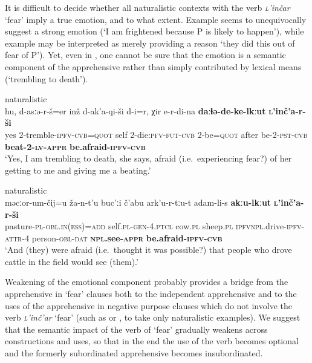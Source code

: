 \documentclass[output=paper,colorlinks,citecolor=brown]{langscibook}
\begin{document}
 It is difficult to decide whether all naturalistic contexts with the verb \textit{\textsc{l}'inčar} `fear' imply a true emotion, and to what extent. Example  seems to unequivocally suggest a strong emotion (`I am frightened because P is likely to happen'), while example  may be interpreted as merely providing a reason `they did this out of fear of P'). Yet, even in , one cannot be sure that the emotion is a semantic component of the apprehensive rather than simply contributed by lexical means (`trembling to death').


\ea \label{ex:DD25} \textnormal{naturalistic} \\
\gll hu, d-asːə-r-š=er inž d-ak'a-qi-ši d-i=r, χir e-r-di-na \textbf{daːɬə-de-ke-lkːut} \textbf{\textsc{l}'inč'a-r-ši} \\
yes 2-tremble-\textsc{ipfv-cvb=quot} self 2-die:\textsc{pfv-fut-cvb} 2-be=\textsc{quot} after be-2-\textsc{pst-cvb} \textbf{beat-2-\textsc{lv-appr}} \textbf{be.afraid-\textsc{ipfv-cvb}} \\
\glt `Yes, I am trembling to death, she says, afraid (i.e.\   experiencing fear?) of her getting to me and giving me a beating.'
\z

\newpage
\ea \label{ex:DD26} \textnormal{naturalistic} \\
\gll məcːor-um-čij=u ža-n-t'u buc'ːi č'abu a{\textlangle}r{\textrangle}k'u-r-tːu-t adam-li-s \textbf{akːu-lkːut} \textbf{\textsc{l}'inč'a-r-ši} \\
pasture-\textsc{pl-obl.in(ess)=add} self\textsc{.pl-gen-4.ptcl} cow.\textsc{pl} sheep.\textsc{pl} {\textlangle}\textsc{ipfv}{\textrangle}\textsc{npl}.drive-\textsc{ipfv-attr}-4 person-\textsc{obl-dat} \textbf{\textsc{npl}.see-\textsc{appr}} \textbf{be.afraid-\textsc{ipfv-cvb}}  \\
\glt `And (they) were afraid (i.e.\   thought it was possible?) that people who drove cattle in the field would see (them).'
\z


\noindent Weakening of the emotional component probably provides a bridge from the apprehensive in `fear' clauses both to the independent apprehensive and to the uses of the apprehensive in negative purpose clauses which do not involve the verb \textit{\textsc{l}'inč'ar} `fear' (such as  or , to take only naturalistic examples). We suggest that the semantic impact of the verb of `fear' gradually weakens across constructions and uses, so that in the end the use of the verb becomes optional and the formerly subordinated apprehensive becomes insubordinated.
\end{document}
